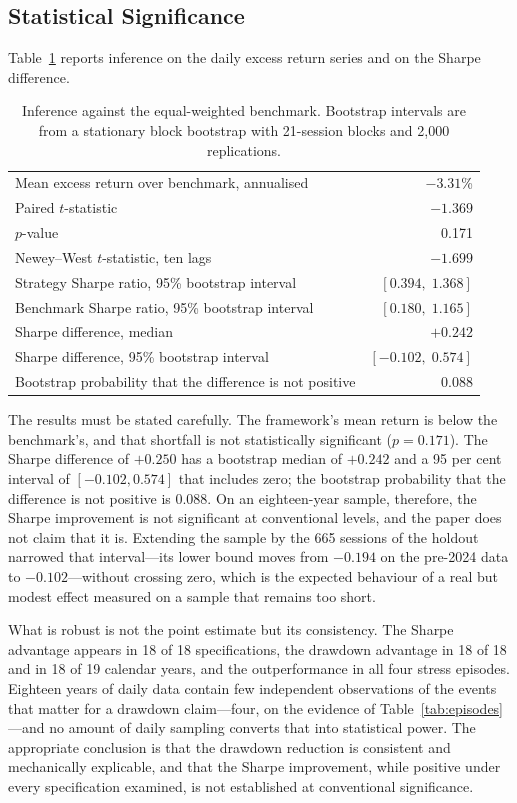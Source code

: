 \documentclass{singlecol-new}
\theoremstyle{TH}{
\newtheorem{lemma}{Lemma}
\newtheorem{theorem}[lemma]{Theorem}
\newtheorem{corrolary}[lemma]{Corrolary}
\newtheorem{conjecture}[lemma]{Conjecture}
\newtheorem{proposition}[lemma]{Proposition}
\newtheorem{claim}[lemma]{Claim}
\newtheorem{stheorem}[lemma]{Wrong Theorem}
\newtheorem{algorithm}{Algorithm}
}
\theoremstyle{THrm}{
\newtheorem{definition}{Definition}[section]
\newtheorem{question}{Question}[section]
\newtheorem{remark}{Remark}
\newtheorem{scheme}{Scheme}
}
\theoremstyle{THhit}{
\newtheorem{case}{Case}[section]
}
\begin{document}
\subsection{Statistical Significance}

Table~\ref{tab:inference} reports inference on the daily excess return series and on the Sharpe
difference.

\begin{table}[!ht]
\centering
\caption{Inference against the equal-weighted benchmark. Bootstrap intervals are from a
stationary block bootstrap with 21-session blocks and 2{,}000 replications.}
\label{tab:inference}
\small
\begin{tabular}{p{6.4cm}r}
\hline
Mean excess return over benchmark, annualised & $-3.31$\% \\
Paired $t$-statistic & $-1.369$ \\
$p$-value & 0.171 \\
Newey--West $t$-statistic, ten lags & $-1.699$ \\
\hline
Strategy Sharpe ratio, 95\% bootstrap interval & $[0.394, \; 1.368]$ \\
Benchmark Sharpe ratio, 95\% bootstrap interval & $[0.180, \; 1.165]$ \\
Sharpe difference, median & $+0.242$ \\
Sharpe difference, 95\% bootstrap interval & $[-0.102, \; 0.574]$ \\
Bootstrap probability that the difference is not positive & 0.088 \\
\hline
\end{tabular}
\end{table}

The results must be stated carefully. The framework's mean return is below the
benchmark's, and that shortfall is not statistically significant ($p = 0.171$). The
Sharpe difference of $+0.250$ has a bootstrap median of $+0.242$ and a 95 per cent
interval of $[-0.102, 0.574]$ that includes zero; the bootstrap probability that the
difference is not positive is 0.088. On an eighteen-year sample, therefore, the Sharpe
improvement is not significant at conventional levels, and the paper does not claim
that it is. Extending the sample by the 665 sessions of the holdout narrowed that
interval---its lower bound moves from $-0.194$ on the pre-2024 data to $-0.102$---without
crossing zero, which is the expected behaviour of a real but modest effect measured on
a sample that remains too short.

What is robust is not the point estimate but its consistency. The Sharpe advantage
appears in 18 of 18 specifications, the drawdown advantage in 18 of 18 and in 18 of 19
calendar years, and the outperformance in all four stress episodes. Eighteen years of
daily data contain few independent observations of the events that matter for a
drawdown claim---four, on the evidence of Table~\ref{tab:episodes}---and no amount of daily
sampling converts that into statistical power. The appropriate conclusion is that the
drawdown reduction is consistent and mechanically explicable, and that the Sharpe
improvement, while positive under every specification examined, is not established at
conventional significance.
\end{document}
